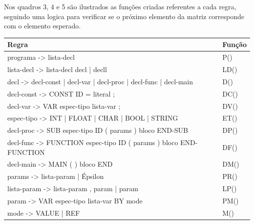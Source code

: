 \documentclass[12pt,oneside,a4paper,chapter=TITLE,section=TITLE,sumario=tradicional]{abntex2}
\begin{document}
Nos quadros 3, 4 e 5 são ilustrados as funções criadas referentes a cada regra, seguindo uma logica para verificar se o próximo elemento da matriz corresponde com o elemento esperado. 

\begin{quadro}[htb]
    \centering
    \vspace{0.5cm}
    \begin{tabular}[h]{|p{13.0cm}|p{2.0cm}|}
        \hline
        \textbf{Regra} & \textbf{Função} \\ 
        \hline\hline
	programa -> lista-decl  & P()   \\ \hline 
	lista-decl -> lista-decl decl | decll  & LD()   \\ \hline 
	decl -> decl-const | decl-var | decl-proc | decl-func | decl-main  & D() \\ \hline
	decl-const -> CONST ID = literal ;  & DC()   \\ \hline 
	decl-var -> VAR espec-tipo lista-var ;  & DV()   \\ \hline 
	espec-tipo -> INT | FLOAT | CHAR | BOOL | STRING  & ET()   \\ \hline 
	decl-proc -> SUB espec-tipo ID ( params ) bloco END-SUB  & DP()   \\ \hline 
	decl-func -> FUNCTION espec-tipo ID ( params ) bloco END-FUNCTION  & DF()   \\ \hline 
	decl-main -> MAIN ( ) bloco END  & DM()   \\ \hline 
	params -> lista-param | Épsilon  & PR()   \\ \hline 
	lista-param -> lista-param , param | param  & LP()   \\ \hline 
	param -> VAR espec-tipo lista-var BY mode  & PM()   \\ \hline 
	mode -> VALUE | REF  & M()   \\ \hline 
    \end{tabular}
\end{quadro}
\end{document}
